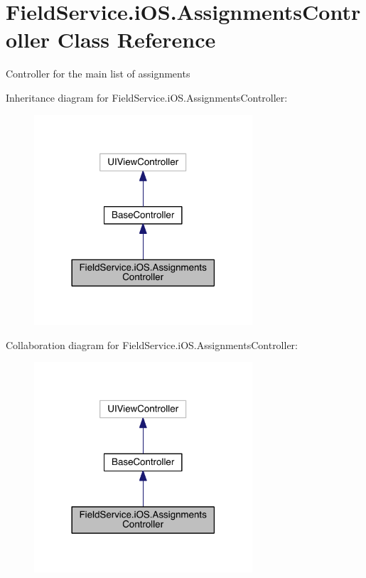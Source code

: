 \hypertarget{class_field_service_1_1i_o_s_1_1_assignments_controller}{\section{Field\+Service.\+i\+O\+S.\+Assignments\+Controller Class Reference}
\label{class_field_service_1_1i_o_s_1_1_assignments_controller}
}


Controller for the main list of assignments  




Inheritance diagram for Field\+Service.\+i\+O\+S.\+Assignments\+Controller\+:
\nopagebreak
\begin{figure}[H]
\begin{center}
\leavevmode
\includegraphics[width=230pt]{class_field_service_1_1i_o_s_1_1_assignments_controller__inherit__graph}
\end{center}
\end{figure}


Collaboration diagram for Field\+Service.\+i\+O\+S.\+Assignments\+Controller\+:
\nopagebreak
\begin{figure}[H]
\begin{center}
\leavevmode
\includegraphics[width=230pt]{class_field_service_1_1i_o_s_1_1_assignments_controller__coll__graph}
\end{center}
\end{figure}
